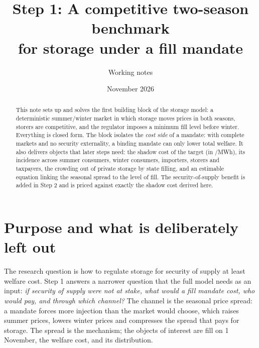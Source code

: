 \documentclass[11pt]{article}
\title{Step 1: A competitive two-season benchmark\\for storage under a fill mandate}
\author{Working notes}
\date{November 2026}
\providecommand{\euro}{\texteuro}
\theoremstyle{definition}
\begin{document}
\maketitle

\begin{abstract}
\noindent This note sets up and solves the first building block of the storage model: a
deterministic summer/winter market in which storage moves prices in both seasons, storers
are competitive, and the regulator imposes a minimum fill level before winter. Everything is
closed form. The block isolates the \emph{cost side} of a mandate: with complete markets and no
security externality, a binding mandate can only lower total welfare. It also delivers objects
that later steps need: the shadow cost of the target (in \euro/MWh), its incidence across
summer consumers, winter consumers, importers, storers and taxpayers, the crowding out of
private storage by state filling, and an estimable equation linking the seasonal spread to the
level of fill. The security-of-supply benefit is added in Step 2 and is priced against exactly
the shadow cost derived here.
\end{abstract}

\section{Purpose and what is deliberately left out}

The research question is how to regulate storage for security of supply at least welfare cost.
Step 1 answers a narrower question that the full model needs as an input:
\emph{if security of supply were not at stake, what would a fill mandate cost, who would pay,
and through which channel?} The channel is the seasonal price spread: a mandate forces more
injection than the market would choose, which raises summer prices, lowers winter prices and
compresses the spread that pays for storage. The spread is the mechanism; the objects of interest
are fill on 1 November, the welfare cost, and its distribution.
\end{document}
